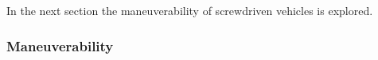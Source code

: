 In the next section the maneuverability of screwdriven vehicles is explored. 









\subsubsection{Maneuverability}
\label{sec:screwdrive_maneuverability}

